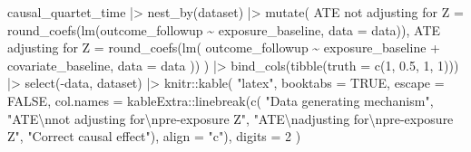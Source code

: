 \documentclass[
  letterpaper,
  DIV=11,
  numbers=noendperiod]{scrartcl}
\newenvironment{Shaded}{\begin{snugshade}}{\end{snugshade}}
\newcommand{\AttributeTok}[1]{\textcolor[rgb]{0.40,0.45,0.13}{#1}}
\newcommand{\ConstantTok}[1]{\textcolor[rgb]{0.56,0.35,0.01}{#1}}
\newcommand{\DecValTok}[1]{\textcolor[rgb]{0.68,0.00,0.00}{#1}}
\newcommand{\FloatTok}[1]{\textcolor[rgb]{0.68,0.00,0.00}{#1}}
\newcommand{\FunctionTok}[1]{\textcolor[rgb]{0.28,0.35,0.67}{#1}}
\newcommand{\NormalTok}[1]{\textcolor[rgb]{0.00,0.23,0.31}{#1}}
\newcommand{\OtherTok}[1]{\textcolor[rgb]{0.00,0.23,0.31}{#1}}
\newcommand{\SpecialCharTok}[1]{\textcolor[rgb]{0.37,0.37,0.37}{#1}}
\newcommand{\StringTok}[1]{\textcolor[rgb]{0.13,0.47,0.30}{#1}}
\begin{document}
\begin{Shaded}
\begin{Highlighting}[]
\NormalTok{causal\_quartet\_time }\SpecialCharTok{|\textgreater{}}
  \FunctionTok{nest\_by}\NormalTok{(dataset) }\SpecialCharTok{|\textgreater{}}
  \FunctionTok{mutate}\NormalTok{(}
    \StringTok{\textasciigrave{}}\AttributeTok{ATE not adjusting for Z}\StringTok{\textasciigrave{}} \OtherTok{=} 
      \FunctionTok{round\_coefs}\NormalTok{(}\FunctionTok{lm}\NormalTok{(outcome\_followup }\SpecialCharTok{\textasciitilde{}}\NormalTok{ exposure\_baseline, }\AttributeTok{data =}\NormalTok{ data)),}
    \StringTok{\textasciigrave{}}\AttributeTok{ATE adjusting for Z}\StringTok{\textasciigrave{}} \OtherTok{=} 
      \FunctionTok{round\_coefs}\NormalTok{(}\FunctionTok{lm}\NormalTok{(}
\NormalTok{        outcome\_followup }\SpecialCharTok{\textasciitilde{}}\NormalTok{ exposure\_baseline }\SpecialCharTok{+}\NormalTok{ covariate\_baseline, }
        \AttributeTok{data =}\NormalTok{ data}
\NormalTok{      ))}
\NormalTok{  ) }\SpecialCharTok{|\textgreater{}}
  \FunctionTok{bind\_cols}\NormalTok{(}\FunctionTok{tibble}\NormalTok{(}\AttributeTok{truth =} \FunctionTok{c}\NormalTok{(}\DecValTok{1}\NormalTok{, }\FloatTok{0.5}\NormalTok{, }\DecValTok{1}\NormalTok{, }\DecValTok{1}\NormalTok{))) }\SpecialCharTok{|\textgreater{}}
  \FunctionTok{select}\NormalTok{(}\SpecialCharTok{{-}}\NormalTok{data, dataset) }\SpecialCharTok{|\textgreater{}}
\NormalTok{  knitr}\SpecialCharTok{::}\FunctionTok{kable}\NormalTok{(}
    \StringTok{"latex"}\NormalTok{, }
    \AttributeTok{booktabs =} \ConstantTok{TRUE}\NormalTok{,}
    \AttributeTok{escape =} \ConstantTok{FALSE}\NormalTok{, }
    \AttributeTok{col.names =}\NormalTok{ kableExtra}\SpecialCharTok{::}\FunctionTok{linebreak}\NormalTok{(}\FunctionTok{c}\NormalTok{(}
      \StringTok{"Data generating mechanism"}\NormalTok{, }
      \StringTok{"ATE}\SpecialCharTok{\textbackslash{}n}\StringTok{not adjusting for}\SpecialCharTok{\textbackslash{}n}\StringTok{pre{-}exposure Z"}\NormalTok{, }
      \StringTok{"ATE}\SpecialCharTok{\textbackslash{}n}\StringTok{adjusting for}\SpecialCharTok{\textbackslash{}n}\StringTok{pre{-}exposure Z"}\NormalTok{,}
      \StringTok{"Correct causal effect"}\NormalTok{), }\AttributeTok{align =} \StringTok{"c"}\NormalTok{),}
    \AttributeTok{digits =} \DecValTok{2}
\NormalTok{  ) }
\end{Highlighting}
\end{Shaded}
\end{document}
